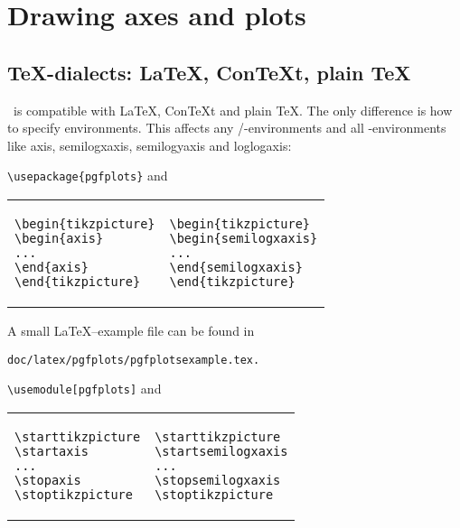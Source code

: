 
\section{Drawing axes and plots}
\subsection{\TeX-dialects: \LaTeX, Con{\TeX}t, plain \TeX }
\label{sec:tex:dialects}%
\PGFPlots\ is compatible with \LaTeX, Con{\TeX}t and plain \TeX. The only difference is how to specify environments. This affects any \PGF/\Tikz-environments and all \PGFPlots-environments like axis, semilogxaxis, semilogyaxis and loglogaxis:
\begin{description}
\def\HEAD{%
	\small
	\lstset{boxpos=b,breaklines=false,aboveskip=3pt,belowskip=3pt}%
	\begin{tabular}{*{2}{p{4cm}}}%
}%
\item[\LaTeX:] \lstinline!\usepackage{pgfplots}! and

{\HEAD
\begin{lstlisting}
\begin{tikzpicture}
\begin{axis}
...
\end{axis}
\end{tikzpicture}
\end{lstlisting}
&
\begin{lstlisting}
\begin{tikzpicture}
\begin{semilogxaxis}
...
\end{semilogxaxis}
\end{tikzpicture}
\end{lstlisting}
\\
\end{tabular}%
}

A small \LaTeX--example file can be found in
\begin{lstlisting}
doc/latex/pgfplots/pgfplotsexample.tex.
\end{lstlisting}

\item[Con{\TeX}t:] \lstinline!\usemodule[pgfplots]! and

{\HEAD
\begin{lstlisting}
\starttikzpicture
\startaxis
...
\stopaxis
\stoptikzpicture
\end{lstlisting}
&
\begin{lstlisting}
\starttikzpicture
\startsemilogxaxis
...
\stopsemilogxaxis
\stoptikzpicture
\end{lstlisting}
\\
\end{tabular}%
}


\end{description}
